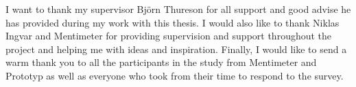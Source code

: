
\begin{acks}
I want to thank my supervisor Björn Thureson for all support and good advise he has provided during my work with this thesis. 
I would also like to thank Niklas Ingvar and Mentimeter for providing supervision and support throughout the project and helping me with ideas and inspiration. 
Finally, I would like to send a warm thank you to all the participants in the study from Mentimeter and Prototyp as well as everyone who took from their time to respond to the survey.
\end{acks}